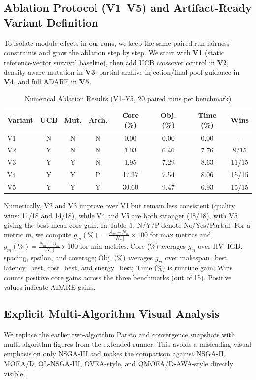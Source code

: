 \documentclass[runningheads]{llncs}
\begin{document}
\subsection{Ablation Protocol (V1--V5) and Artifact-Ready Variant Definition}
To isolate module effects in our runs, we keep the same paired-run fairness constraints and grow the ablation step by step. We start with \textbf{V1} (static reference-vector survival baseline), then add UCB crossover control in \textbf{V2}, density-aware mutation in \textbf{V3}, partial archive injection/final-pool guidance in \textbf{V4}, and full ADARE in \textbf{V5}.

\begin{table}[H]
\caption{Numerical Ablation Results (V1--V5, 20 paired runs per benchmark)}
\label{tab:ablation_design}
\centering
\small
\begin{tabular*}{\textwidth}{@{\extracolsep{\fill}}lccccccc@{}}
\toprule
Variant & UCB & Mut. & Arch. & Core (\%) & Obj. (\%) & Time (\%) & Wins \\
\midrule
V1 & N & N & N & 0.00 & 0.00 & 0.00 & -- \\
V2 & Y & N & N & 1.03 & 6.46 & 7.76 & 8/15 \\
V3 & Y & Y & N & 1.95 & 7.29 & 8.63 & 11/15 \\
V4 & Y & Y & P & 17.37 & 7.54 & 8.06 & 15/15 \\
V5 & Y & Y & Y & 30.60 & 9.47 & 6.93 & 15/15 \\
\bottomrule
\end{tabular*}
\end{table}

Numerically, V2 and V3 improve over V1 but remain less consistent (quality wins: 11/18 and 14/18), while V4 and V5 are both stronger (18/18), with V5 giving the best mean core gain. In Table~\ref{tab:ablation_design}, N/Y/P denote No/Yes/Partial. For a metric $m$, we compute $g_m(\%)=\frac{A_m-N_m}{|N_m|}\times100$ for max metrics and $g_m(\%)=\frac{N_m-A_m}{|N_m|}\times100$ for min metrics. Core (\%) averages $g_m$ over HV, IGD, spacing, epsilon, and coverage; Obj. (\%) averages $g_m$ over makespan\_best, latency\_best, cost\_best, and energy\_best; Time (\%) is runtime gain; Wins counts positive core gains across the three benchmarks (out of 15). Positive values indicate ADARE gains.

\subsection{Explicit Multi-Algorithm Visual Analysis}
We replace the earlier two-algorithm Pareto and convergence snapshots with multi-algorithm figures from the extended runner. This avoids a misleading visual emphasis on only NSGA-III and makes the comparison against NSGA-II, MOEA/D, QL-NSGA-III, OVEA-style, and QMOEA/D-AWA-style directly visible.
\end{document}
